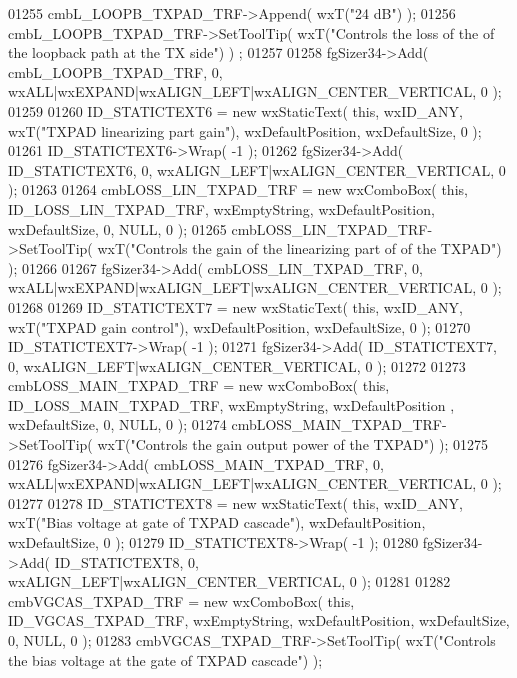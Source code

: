 \begin{DoxyCode}
01255     cmbL_LOOPB_TXPAD_TRF->Append( wxT(\textcolor{stringliteral}{"24 dB"}) );
01256     cmbL_LOOPB_TXPAD_TRF->SetToolTip( wxT(\textcolor{stringliteral}{"Controls the loss of the of the loopback path at the TX side"}) )
      ;
01257     
01258     fgSizer34->Add( cmbL_LOOPB_TXPAD_TRF, 0, wxALL|wxEXPAND|wxALIGN\_LEFT|wxALIGN\_CENTER\_VERTICAL, 0 );
01259     
01260     ID_STATICTEXT6 = \textcolor{keyword}{new} wxStaticText( \textcolor{keyword}{this}, wxID\_ANY, wxT(\textcolor{stringliteral}{"TXPAD linearizing part gain"}), 
      wxDefaultPosition, wxDefaultSize, 0 );
01261     ID_STATICTEXT6->Wrap( -1 );
01262     fgSizer34->Add( ID_STATICTEXT6, 0, wxALIGN\_LEFT|wxALIGN\_CENTER\_VERTICAL, 0 );
01263     
01264     cmbLOSS_LIN_TXPAD_TRF = \textcolor{keyword}{new} wxComboBox( \textcolor{keyword}{this}, ID_LOSS_LIN_TXPAD_TRF, wxEmptyString, wxDefaultPosition, 
      wxDefaultSize, 0, NULL, 0 ); 
01265     cmbLOSS_LIN_TXPAD_TRF->SetToolTip( wxT(\textcolor{stringliteral}{"Controls the gain of the linearizing part of of the TXPAD"}) );
01266     
01267     fgSizer34->Add( cmbLOSS_LIN_TXPAD_TRF, 0, wxALL|wxEXPAND|wxALIGN\_LEFT|wxALIGN\_CENTER\_VERTICAL, 0 );
01268     
01269     ID_STATICTEXT7 = \textcolor{keyword}{new} wxStaticText( \textcolor{keyword}{this}, wxID\_ANY, wxT(\textcolor{stringliteral}{"TXPAD gain control"}), wxDefaultPosition, 
      wxDefaultSize, 0 );
01270     ID_STATICTEXT7->Wrap( -1 );
01271     fgSizer34->Add( ID_STATICTEXT7, 0, wxALIGN\_LEFT|wxALIGN\_CENTER\_VERTICAL, 0 );
01272     
01273     cmbLOSS_MAIN_TXPAD_TRF = \textcolor{keyword}{new} wxComboBox( \textcolor{keyword}{this}, ID_LOSS_MAIN_TXPAD_TRF, wxEmptyString, wxDefaultPosition
      , wxDefaultSize, 0, NULL, 0 ); 
01274     cmbLOSS_MAIN_TXPAD_TRF->SetToolTip( wxT(\textcolor{stringliteral}{"Controls the gain  output power of the TXPAD"}) );
01275     
01276     fgSizer34->Add( cmbLOSS_MAIN_TXPAD_TRF, 0, wxALL|wxEXPAND|wxALIGN\_LEFT|wxALIGN\_CENTER\_VERTICAL, 0 );
01277     
01278     ID_STATICTEXT8 = \textcolor{keyword}{new} wxStaticText( \textcolor{keyword}{this}, wxID\_ANY, wxT(\textcolor{stringliteral}{"Bias voltage at gate of TXPAD cascade"}), 
      wxDefaultPosition, wxDefaultSize, 0 );
01279     ID_STATICTEXT8->Wrap( -1 );
01280     fgSizer34->Add( ID_STATICTEXT8, 0, wxALIGN\_LEFT|wxALIGN\_CENTER\_VERTICAL, 0 );
01281     
01282     cmbVGCAS_TXPAD_TRF = \textcolor{keyword}{new} wxComboBox( \textcolor{keyword}{this}, ID_VGCAS_TXPAD_TRF, wxEmptyString, wxDefaultPosition, 
      wxDefaultSize, 0, NULL, 0 ); 
01283     cmbVGCAS_TXPAD_TRF->SetToolTip( wxT(\textcolor{stringliteral}{"Controls the bias voltage at the gate of TXPAD cascade"}) );

\end{DoxyCode}

